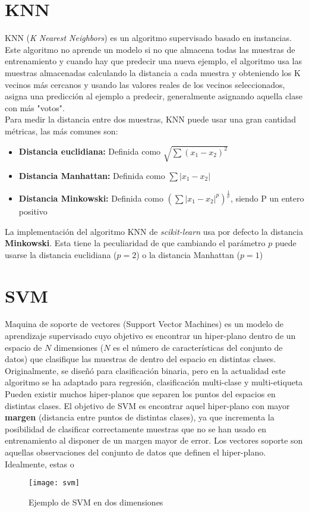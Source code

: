 \section{KNN}
\label{alg:knn}
KNN (\textit{K Nearest Neighbors}) es un algoritmo supervisado basado en instancias. Este algoritmo no aprende un modelo si no que almacena todas las muestras de entrenamiento y cuando hay que predecir una nueva ejemplo, el algoritmo usa las muestras almacenadas calculando la distancia a cada muestra y obteniendo los K vecinos más cercanos y usando las valores reales de los vecinos seleccionados, asigna una predicción al ejemplo a predecir, generalmente asignando aquella clase con más "votos".\\
\linebreak
Para medir la distancia entre dos muestras, KNN puede usar una gran cantidad métricas, las más comunes son:
\begin{itemize}
	\item \textbf{Distancia euclidiana:} Definida como $\sqrt{\sum(x_1 - x_2)^2}$
	\item \textbf{Distancia Manhattan:} Definida como $\sum|x_1 - x_2|$
	\item \textbf{Distancia Minkowski:} Definida como $(\sum|x_1 - x_2|^p)^{\frac{1}{p}}$, siendo P un entero positivo
\end{itemize}
La implementación del algoritmo KNN de \textit{scikit-learn} usa por defecto la distancia \textbf{Minkowski}. Esta tiene la peculiaridad de que cambiando el parámetro $p$ puede usarse la distancia euclidiana ($p=2$) o la distancia Manhattan ($p=1$)
\section{SVM}
\label{sec:svm}
Maquina de soporte de vectores (Support Vector Machines) es un modelo de aprendizaje supervisado cuyo objetivo es encontrar un hiper-plano dentro de un espacio de $N$ dimensiones ($N$ es el número de características del conjunto de datos) que clasifique las muestras de dentro del espacio en distintas clases. Originalmente, se diseñó para clasificación binaria, pero en la actualidad este algoritmo se ha adaptado para regresión, clasificación multi-clase y multi-etiqueta\\
\linebreak
Pueden existir muchos hiper-planos que separen los puntos del espacios en distintas clases. El objetivo de SVM es encontrar aquel hiper-plano con mayor \textbf{margen} (distancia entre puntos de distintas clases), ya que incrementa la posibilidad de clasificar correctamente muestras que no se han usado en entrenamiento al disponer de un margen mayor de error. Los vectores soporte son aquellas observaciones del conjunto de datos que definen el hiper-plano. Idealmente, estas o\\
\begin{figure}[H]
	\centering
	\texttt{[image: svm]}
	\caption{Ejemplo de SVM en dos dimensiones}
	\label{fig:svm}
\end{figure}
